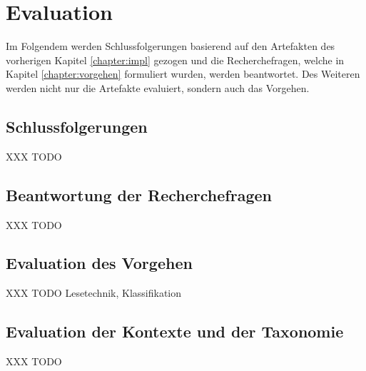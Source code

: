 \chapter{Evaluation}
\label{chapter:evaluation}
Im Folgendem werden Schlussfolgerungen basierend auf den Artefakten des vorherigen Kapitel \ref{chapter:impl} gezogen und die Recherchefragen, welche in Kapitel \ref{chapter:vorgehen} formuliert wurden, werden beantwortet. Des Weiteren werden nicht nur die Artefakte evaluiert, sondern auch das Vorgehen. \\

\section{Schlussfolgerungen}
XXX TODO \\

\section{Beantwortung der Recherchefragen}
XXX TODO \\

\section{Evaluation des Vorgehen}
XXX TODO Lesetechnik, Klassifikation \\

\section{Evaluation der Kontexte und der Taxonomie}
XXX TODO \\

